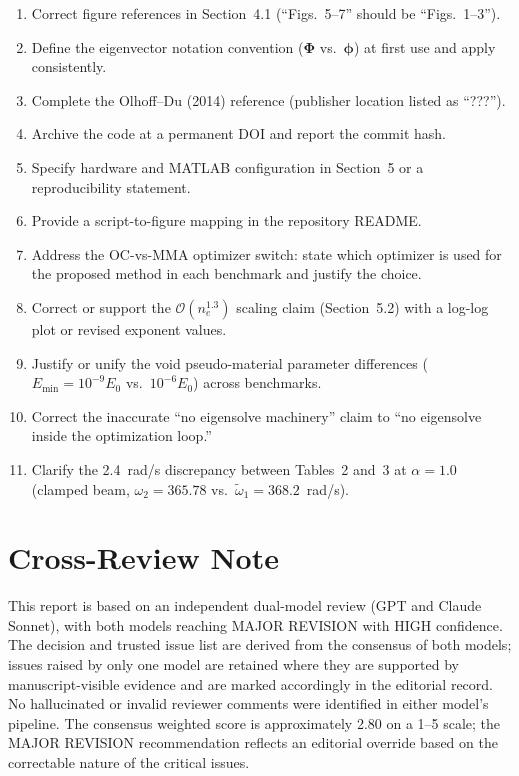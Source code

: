 \documentclass[11pt,a4paper]{article}
\begin{document}
\begin{enumerate}[leftmargin=*, label=\textbf{mn\arabic*.}]

\item Correct figure references in Section~4.1 (``Figs.~5--7'' should
  be ``Figs.~1--3'').
\item Define the eigenvector notation convention ($\boldsymbol{\Phi}$
  vs.\ $\boldsymbol{\phi}$) at first use and apply consistently.
\item Complete the Olhoff--Du (2014) reference (publisher location listed
  as ``???'').
\item Archive the code at a permanent DOI and report the commit hash.
\item Specify hardware and MATLAB configuration in Section~5 or a
  reproducibility statement.
\item Provide a script-to-figure mapping in the repository README.
\item Address the OC-vs-MMA optimizer switch: state which optimizer is
  used for the proposed method in each benchmark and justify the choice.
\item Correct or support the $\mathcal{O}(n_e^{1.3})$ scaling claim
  (Section~5.2) with a log-log plot or revised exponent values.
\item Justify or unify the void pseudo-material parameter differences
  ($E_\mathrm{min}=10^{-9}E_0$ vs.\ $10^{-6}E_0$) across benchmarks.
\item Correct the inaccurate ``no eigensolve machinery'' claim to
  ``no eigensolve inside the optimization loop.''
\item Clarify the 2.4~rad/s discrepancy between Tables~2 and~3 at
  $\alpha=1.0$ (clamped beam, $\omega_2=365.78$ vs.\
  $\widetilde{\omega}_1=368.2$~rad/s).

\end{enumerate}

\section*{Cross-Review Note}

This report is based on an independent dual-model review (GPT and Claude
Sonnet), with both models reaching MAJOR REVISION with HIGH confidence.
The decision and trusted issue list are derived from the consensus of
both models; issues raised by only one model are retained where they
are supported by manuscript-visible evidence and are marked accordingly
in the editorial record. No hallucinated or invalid reviewer comments
were identified in either model's pipeline. The consensus weighted score
is approximately 2.80 on a 1--5 scale; the MAJOR REVISION recommendation
reflects an editorial override based on the correctable nature of the
critical issues.
\end{document}
